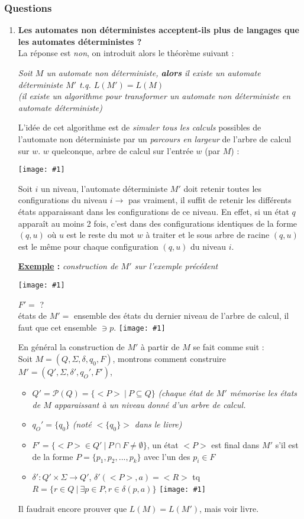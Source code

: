 \documentclass{article}
\newcommand{\titre}[1]{\textcolor{title}{#1}}
\newcommand{\tsssect}[1]{\titre{\subsubsection{#1}}}
\newcommand{\term}[1]{\textit{\textcolor{maintitle}{#1}}}
\newcommand{\imageR}[2]{\texttt{[image: \#1]}}
\newcommand{\imgR}[2]{\begin{center}\texttt{[image: \#1]}\end{center}}
\begin{document}
\begin{sffamily}
\tsssect{Questions}

\begin{enumerate}
\item \textbf{Les automates non déterministes acceptent-ils plus de langages que les automates déterministes ?} \\
La réponse est \term{non}, on introduit alors le théorème suivant : 
\begin{center}
\term{Soit $M$ un automate non déterministe, \textbf{alors} il existe un automate déterministe $M'$ t.q. $L(M') = 
L(M)$} \\ \textit{(il existe un algorithme pour transformer un automate non déterministe en automate déterministe)}
\end{center}
L'idée de cet algorithme est de \term{simuler tous les calculs} possibles de l'automate non déterministe par un 
\term{parcours en largeur} de l'arbre de calcul sur $w$.
$w$ quelconque, arbre de calcul sur l'entrée $w$ (par $M$) :
\begin{multicols}{2}
\imgR{img19.png}{150}
Soit $i$ un niveau, l'automate déterministe $M'$ doit retenir toutes les configurations du niveau $i \rightarrow$ pas 
vraiment, il suffit de retenir les différents états apparaissant dans les configurations de ce niveau. En effet, si un 
état $q$ apparaît au moins 2 fois, c'est dans des configurations identiques de la forme $(q,u)$ où $u$ est le reste du
mot $w$ à traiter et le sous arbre de racine $(q,u)$ est le même pour chaque configuration $(q,u)$ du niveau $i$.
\end{multicols}

\textbf{\underline{Exemple} :} \textit{construction de $M'$ sur l'exemple précédent}
\imgR{img11.png}{300}
\begin{multicols}{2}
$F'=$ ? \\
états de $M' =$ ensemble des états du dernier niveau de l'arbre de calcul, il faut que cet ensemble $\ni p$.
\imageR{img20.png}{100}
\end{multicols}
En général la construction de $M'$ à partir de $M$ se fait comme suit : \\
Soit $M = (Q,\Sigma,\delta,q_0,F)$, montrons comment construire $M'=(Q',\Sigma,\delta',q_O',F')$,
\begin{itemize}
\item $Q' = \mathcal{P}(Q) = \{<P>\ |\ P\subseteq Q\}$ \textit{(chaque état de $M'$ mémorise les états de $M$ 
apparaissant à un niveau donné d'un arbre de calcul.}
\item $q_O' = \{q_0\}$ \textit{(noté $<\{q_0\}>$ dans le livre)}
\item $F' = \{<P> \in Q'\ |\ P\cap F \neq \emptyset \}$, un état $<P>$ est final dans $M'$ s'il est de la forme 
$P=\{p_1,p_2,...,p_k\}$ avec l'un des $p_i \in F$
\item $\delta' : Q' \times \Sigma \rightarrow Q'$, $\delta'(<P>,a) = <R>$ tq $R = \{r \in Q\ |\ \exists p \in P, r \in
\delta(p,a)\}$ \imageR{img21.png}{100}
\end{itemize}
Il faudrait encore prouver que $L(M)=L(M')$, mais voir livre.


\end{enumerate}
\end{sffamily}
\end{document}
